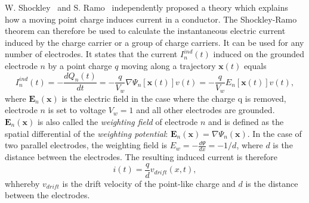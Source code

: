 \documentclass[twoside,12pt]{packages/mytustyle}  %
\begin{document}
W. Shockley~\cite{SHOCKLEY:00000} and S. Ramo~\cite{RAMO:00000} independently proposed a theory which explains how a moving point charge induces current in a conductor. The Shockley-Ramo theorem can therefore be used to calculate the instantaneous electric current induced by the charge carrier or a group of charge carriers. It can be used for any number of electrodes. It states that the current $I_n^{ind}(t)$ induced on the grounded electrode $n$ by a point charge $q$ moving along a trajectory $\textbf{x}(t)$ equals
\begin{equation}
\label{eq:ramo}
I_n^{ind}(t) = -\frac{dQ_n(t)}{dt} =  -\frac{q}{V_w}\nabla\Psi_n[\textbf{x}(t)]v(t)  =  -\frac{q}{V_w}E_n[\textbf{x}(t)]v(t),
\end{equation}
where $\textbf{E}_n(\textbf{x})$ is the electric field in the case where the charge q is removed, electrode $n$ is  set to voltage $V_w=1$ and all other electrodes are grounded. $\textbf{E}_n(\textbf{x})$ is also called the \emph{weighting field} of electrode $n$ and is defined as the spatial differential of the \emph{weighting potential}: $\textbf{E}_n(\textbf{x})=\nabla \Psi_n(\textbf{x})$. In the case of two parallel electrodes, the weighting field is $E_w = -\frac{d\Psi}{dx} = -1/d$, where $d$ is the distance between the electrodes. The resulting induced current is therefore
\begin{equation}
\label{eq:ramoparallel}
i(t) = \frac{q}{d}v_{drift}(x,t),
\end{equation} 
whhereby $v_{drift}$ is the drift velocity of the point-like charge and $d$ is the distance between the electrodes.






\end{document}
